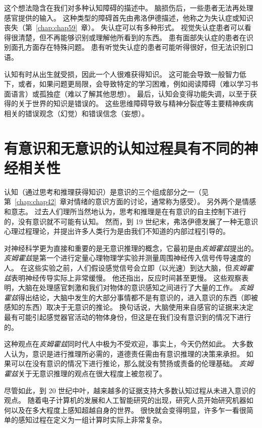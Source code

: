 这个想法隐含在我们对多种认知障碍的描述中。
脑损伤后，一些患者无法再处理感官提供的输入。
这种类型的障碍首先由弗洛伊德描述，他称之为失认症或知识丧失（第~\ref{chap:chap59}~章）。
失认症可以有多种形式。
视觉失认症患者可以看得很清楚，但不再能够识别或理解他所看到的东西。
患有面部失认症的患者在识别面孔方面存在特殊问题。
患有听觉失认症的患者可能听得很好，但无法识别口语。


认知有时从出生就受损，因此一个人很难获得知识。
这可能会导致一般智力低下，或者，如果问题更局限，会导致特定的学习困难，例如阅读障碍（难以学习书面语言）或孤独症（难以了解其他思想）。
最后，认知会变得功能失调，以至于获得的关于世界的知识是错误的。
这些思维障碍导致与精神分裂症等主要精神疾病相关的错误观念（幻觉）和错误信念（妄想）。



\section{有意识和无意识的认知过程具有不同的神经相关性}

认知（通过思考和推理获得知识）是意识的三个组成部分之一（见第~\ref{chap:chap42}~章对情绪的意识方面的讨论，通常称为感受）。
另外两个是情感和意志。
过去人们理所当然地认为，思考和推理是在有意识的自主控制下进行的，没有意识就不可能有认知。
然而，到 19 世纪末，弗洛伊德发展了一种无意识心理过程理论，并提出许多人类行为是由我们不知道的内部过程引导的。


对神经科学更为直接和重要的是无意识推理的概念，它最初是由\textit{亥姆霍兹}提出的。
\textit{亥姆霍兹}是第一个进行定量心理物理学实验并测量周围神经传入信号传导速度的人。
在这些实验之前，人们假设感觉信号会立即（以光速）到达大脑，但\textit{亥姆霍兹}表明神经传导实际上非常缓慢。
他还指出，反应时间甚至更慢。
这些观察表明，大脑在处理感官刺激和我们对物体的意识感知之间进行了大量的工作。
\textit{亥姆霍兹}得出结论，大脑中发生的大部分事情都不是有意识的，进入意识的东西（即被感知的东西）取决于无意识的推论。
换句话说，大脑使用来自感官的证据来决定最有可能引起感觉器官活动的物体身份，但这是在我们没有意识到的情况下进行的。


这种观点在\textit{亥姆霍兹}同时代人中极为不受欢迎，事实上，今天仍然如此。
大多数人认为，意识是进行推理所必需的，道德责任需由有意识推理的决策来承担。
如果可以在没有意识的情况下进行推论，那么就没有赞扬或责备的伦理基础。
\textit{亥姆霍兹}关于无意识推理的观点在很大程度上被忽视了。



尽管如此，到 20 世纪中叶，越来越多的证据支持大多数认知过程从未进入意识的观点。
随着电子计算机的发展和人工智能研究的出现，研究人员开始研究机器如何以及在多大程度上感知超越自身的世界。
很快就会变得明显，许多乍一看很简单的感知过程在定义为一组计算时实际上非常复杂。


